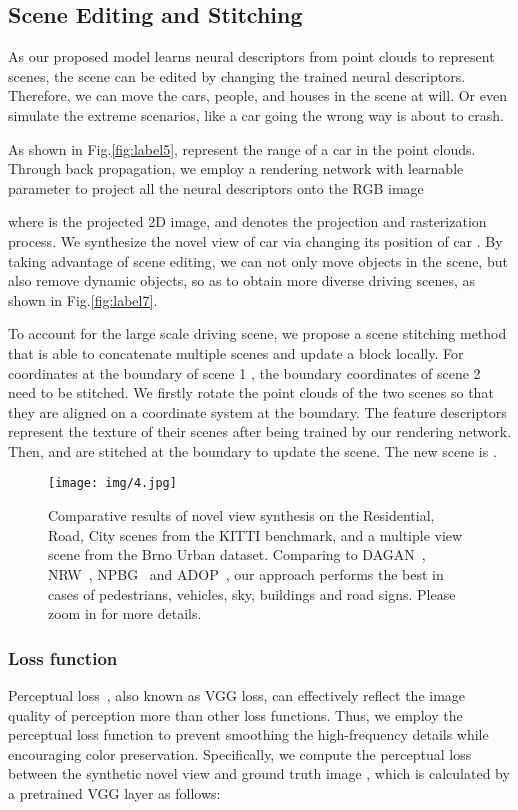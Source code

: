 \documentclass[sigconf]{acmart}
\begin{document}
\subsection{Scene Editing and Stitching}
As our proposed model learns neural descriptors from point clouds to represent scenes, the scene can be edited by changing the trained neural descriptors. Therefore, we can move the cars, people, and houses in the scene at will. Or even simulate the extreme scenarios, like a car going the wrong way is about to crash. 

As shown in Fig.\ref{fig:label5},  represent the range of a car in the point clouds. Through back propagation, we employ a rendering network with learnable parameter  to project all the neural descriptors  onto the RGB image

where  is the projected 2D image, and  denotes the projection and rasterization process. We synthesize the novel view of car  via changing its position of car . By taking advantage of scene editing, we can not only move objects in the scene, but also remove dynamic objects, so as to obtain more diverse driving scenes, as shown in Fig.\ref{fig:label7}.


To account for the large scale driving scene, we propose a scene stitching method that is able to concatenate multiple scenes and update a block locally. For coordinates at the boundary of scene 1 , the boundary coordinates of scene 2  need to be stitched. We firstly rotate the point clouds  of the two scenes so that they are aligned on a coordinate system at the boundary. The feature descriptors  represent the texture of their scenes after being trained by our rendering network. Then,  and  are stitched at the boundary to update the scene. The new scene is .


\begin{figure*}[t]
  \centering
  \texttt{[image: img/4.jpg]}
  \caption{Comparative results of novel view synthesis on the Residential, Road, City scenes from the KITTI benchmark, and a multiple view scene from the Brno Urban dataset. 
  Comparing to DAGAN~\cite{tang2020dual}, NRW~\cite{meshry2019neural}, NPBG~\cite{aliev2020neural} and ADOP~\cite{ruckert2021adop}, our approach performs the best in cases of pedestrians, vehicles, sky, buildings and road signs. Please zoom in for more details.}
   \label{fig:label6}
\end{figure*}


\subsubsection{Loss function}
Perceptual loss~\cite{johnson2016perceptual}, also known as VGG loss, can effectively reflect the image quality of perception more than other loss functions. Thus, we employ the perceptual loss function to prevent smoothing the high-frequency details while encouraging color preservation. Specifically, we compute the perceptual loss between the synthetic novel view and ground truth image , which is calculated by a pretrained VGG layer  as follows:
\end{document}
